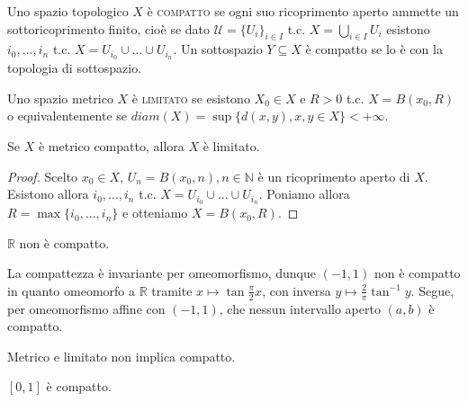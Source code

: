 \begin{defn}
  Uno spazio topologico $X$ è \textsc{compatto} se ogni suo ricoprimento aperto ammette un sottoricoprimento finito, cioè se dato $\mathcal{U}=\{U_i\}_{i \in I}$ t.c. $\displaystyle X=\bigcup_{i \in I} U_i$ esistono $i_0, \dots, i_n$ t.c. $X=U_{i_0} \cup \dots \cup U_{i_n}$. Un sottospazio $Y \subseteq X$ è compatto se lo è con la topologia di sottospazio.
\end{defn}

\begin{defn}
  Uno spazio metrico $X$ è \textsc{limitato} se esistono $X_0 \in X$ e $R>0$ t.c. $X=B(x_0, R)$ o equivalentemente se $diam(X)=\sup{\{d(x, y), x, y \in X\}}<+\infty$.
\end{defn}

\begin{lm} \label{mc->l}
  Se $X$ è metrico compatto, allora $X$ è limitato.
\end{lm}

\begin{proof}
  Scelto $x_0 \in X$, $U_n=B(x_0, n), n \in \mathbb{N}$ è un ricoprimento aperto di $X$. Esistono allora $i_0, \dots, i_n$ t.c. $X=U_{i_0} \cup \dots \cup U_{i_n}$. Poniamo allora $R=\max\{i_0, \dots, i_n\}$ e otteniamo $X=B(x_0, R)$.
\end{proof}

\begin{cor}
  $\mathbb{R}$ non è compatto.
\end{cor}

\begin{oss}
  La compattezza è invariante per omeomorfismo, dunque $(-1, 1)$ non è compatto in quanto omeomorfo a $\mathbb{R}$ tramite $x \longmapsto \tan{\frac{\pi}{2}x}$, con inversa $y \longmapsto \frac{2}{\pi}\tan^{-1}{y}$. Segue, per omeomorfismo affine con $(-1, 1)$, che nessun intervallo aperto $(a, b)$ è compatto.
\end{oss}

\begin{cor}
  Metrico e limitato non implica compatto.
\end{cor}

\begin{thm}
  $[0, 1]$ è compatto.
\end{thm}


